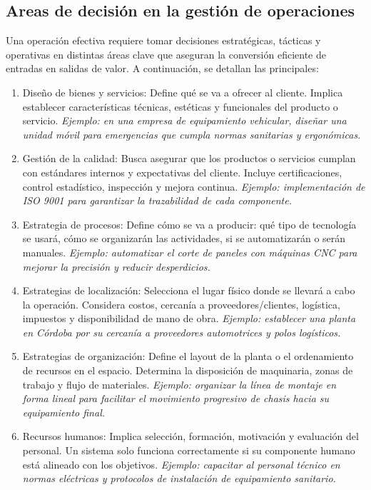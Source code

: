 \documentclass[a4paper,oneside,11pt]{article}
\begin{document}
\subsection{Areas de decisión en la gestión de operaciones}

Una operación efectiva requiere tomar decisiones estratégicas, tácticas y operativas en distintas áreas clave que aseguran la conversión eficiente de entradas en salidas de valor. A continuación, se detallan las principales:

\begin{enumerate}
    \item Diseño de bienes y servicios: Define qué se va a ofrecer al cliente. Implica establecer características técnicas, estéticas y funcionales del producto o servicio. \textit{Ejemplo: en una empresa de equipamiento vehicular, diseñar una unidad móvil para emergencias que cumpla normas sanitarias y ergonómicas.}
    \item Gestión de la calidad: Busca asegurar que los productos o servicios cumplan con estándares internos y expectativas del cliente. Incluye certificaciones, control estadístico, inspección y mejora continua. \textit{Ejemplo: implementación de ISO 9001 para garantizar la trazabilidad de cada componente.}
    \item Estrategia de procesos: Define cómo se va a producir: qué tipo de tecnología se usará, cómo se organizarán las actividades, si se automatizarán o serán manuales. \textit{Ejemplo: automatizar el corte de paneles con máquinas CNC para mejorar la precisión y reducir desperdicios.}
    \item Estrategias de localización: Selecciona el lugar físico donde se llevará a cabo la operación. Considera costos, cercanía a proveedores/clientes, logística, impuestos y disponibilidad de mano de obra. \textit{Ejemplo: establecer una planta en Córdoba por su cercanía a proveedores automotrices y polos logísticos.}
    \item Estrategias de organización: Define el layout de la planta o el ordenamiento de recursos en el espacio. Determina la disposición de maquinaria, zonas de trabajo y flujo de materiales. \textit{Ejemplo: organizar la línea de montaje en forma lineal para facilitar el movimiento progresivo de chasis hacia su equipamiento final.}
    \item Recursos humanos: Implica selección, formación, motivación y evaluación del personal. Un sistema solo funciona correctamente si su componente humano está alineado con los objetivos. \textit{Ejemplo: capacitar al personal técnico en normas eléctricas y protocolos de instalación de equipamiento sanitario.}

\end{enumerate}
\end{document}
